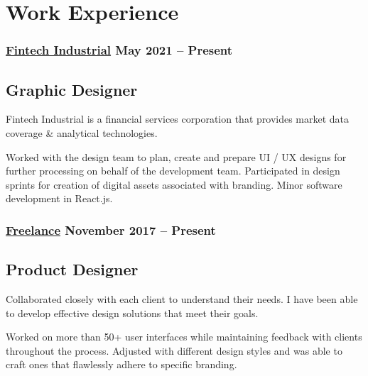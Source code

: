 \section*{Work Experience}
%
%
%
\subsubsection*{
  \href{https://www.linkedin.com/company/fintech-industrial/}{Fintech Industrial}
  \hspace*{\fill}
  May 2021 -- Present
}
\subsection*{Graphic Designer}
Fintech Industrial is a financial services corporation that provides market data coverage \& analytical technologies.
\smallskip
\begin{tasks}
  \task Worked with the design team to plan, create and prepare UI / UX designs for further processing on behalf of the development team.
  \task Participated in design sprints for creation of digital assets associated with branding.
  \task Minor software development in React.js.
\end{tasks}
%
%
\medskip
\subsubsection*{
  \href{https://bumbleboss.xyz/}{Freelance}
  \hspace*{\fill}
  November 2017 -- Present
}
\subsection*{Product Designer}
Collaborated closely with each client to understand their needs. I have been able to develop effective design solutions that meet their goals. 
\smallskip
\begin{tasks}
  \task Worked on more than 50+ user interfaces while maintaining feedback with clients throughout the process.
  \task Adjusted with different design styles and was able to craft ones that flawlessly adhere to specific branding.
\end{tasks}